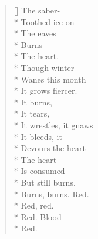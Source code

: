 \label{ch:the_blood_of_winter}
\settowidth{\versewidth}{It wrestles, it gnaws}
\begin{verse}[\versewidth]
The saber-\\*
Toothed ice on\\*
The eaves\\*
Burns\\*
The heart.\\*
Though winter\\*
Wanes this month\\*
It grows fiercer.\\*
It burns,\\*
It tears,\\*
It wrestles, it gnaws\\*
It bleeds, it\\*
Devours the heart\\*
The heart\\*
Is consumed\\*
But still burns.\\*
Burns, burns. Red.\\*
Red, red.\\*
Red. Blood\\*
Red.
\end{verse}
